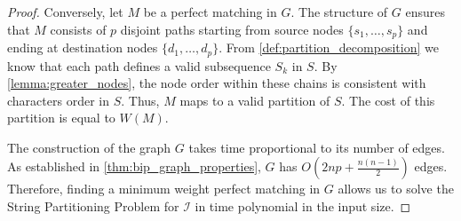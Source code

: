 \begin{proof}
    Conversely, let $M$ be a perfect matching in $G$. The structure of $G$ ensures that $M$ consists of $p$ disjoint paths starting from source nodes $\{s_1, \dots, s_p\}$ and ending at destination nodes $\{d_1, \dots, d_p\}$. From \cref{def:partition_decomposition} we know that each path defines a valid subsequence $S_k$ in $S$. By \cref{lemma:greater_nodes}, the node order within these chains is consistent with characters order in $S$. Thus, $M$ maps to a valid partition of $S$. The cost of this partition is equal to $W(M)$.

    The construction of the graph $G$ takes time proportional to its number of edges. As established in \cref{thm:bip_graph_properties}, $G$ has $O(2np + \frac{n(n-1)}{2})$ edges. Therefore, finding a minimum weight perfect matching in $G$ allows us to solve the String Partitioning Problem for $\mathcal{I}$ in time polynomial in the input size.
\end{proof}

